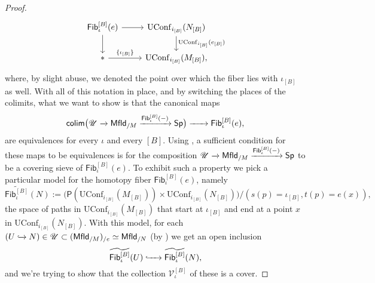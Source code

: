 \documentclass[../text.tex]{subfiles}
\begin{document}
\begin{proof}
\begin{equation}
        \begin{tikzcd}
            \mathsf{Fib}_\iota^{[B]}(e) \arrow[d] \arrow[r] & \mathrm{UConf}_{i_{[B]}}(N_{[B]}) \arrow[d, "\mathrm{UConf}_{i_{[B]}}(e_{[B]})"] \\
            * \arrow[r, "\{\iota_{[B]}\}"] & \mathrm{UConf}_{i_{[B]}}(M_{[B]}),
        \end{tikzcd}
    \end{equation}
    where, by slight abuse, we denoted the point over which the fiber lies with $\iota_{[B]}$ as well. With all of this notation in place, and by switching the places of the colimits, what we want to show is that the canonical maps
    \begin{equation}
        \mathsf{colim} \big( \mathscr{U} \xrightarrow{} \mfld[r]_{/M} \xrightarrow{\mathsf{Fib}_{\iota}^{[B]}(-)} \mathsf{Sp} \big) \xrightarrow{\ \ \ \ \ } \mathsf{Fib}_{\iota}^{[B]}(e),
    \end{equation}
    are equivalences for every $\iota$ and every $[B]$. Using \cite[Prop.A.3.2]{lurie_ha}, a sufficient condition for these maps to be equivalences is for the composition $\mathscr{U} \xrightarrow{} \mfld[r]_{/M} \xrightarrow{\mathsf{Fib}_{\iota}^{[B]}(-)} \mathsf{Sp}$ to be a covering sieve of $\mathsf{Fib}_{\iota}^{[B]}(e)$. To exhibit such a property we pick a particular model for the homotopy fiber $\mathsf{Fib}_{\iota}^{[B]}(e)$, namely
    \begin{equation}
        \widetilde{\mathsf{Fib}_{\iota}^{[B]}}(N) := \big( \mathsf{P}(\mathrm{UConf}_{i_{[B]}}(M_{[B]})) \times \mathrm{UConf}_{i_{[B]}}(N_{[B]}) \big) / (s (p) = \iota_{[B]}, t (p) = e(x)),
    \end{equation}
    the space of paths in $\mathrm{UConf}_{i_{[B]}}(M_{[B]})$ that start at $\iota_{[B]}$ and end at a point $x$ in $\mathrm{UConf}_{i_{[B]}}(N_{[B]})$. With this model, for each $(U \xhookrightarrow{} N) \in \mathscr{U} \subset (\mfld[r]_{/M})_{/e} \simeq \mfld[r]_{/N}$ (by ) we get an open inclusion
    \begin{equation}
        \widetilde{\mathsf{Fib}_{\iota}^{[B]}}(U) \xhookrightarrow{\ \ \ \ } \widetilde{\mathsf{Fib}_{\iota}^{[B]}}(N),
    \end{equation}
    and we're trying to show that the collection $\mathscr{V}_{\iota}^{[B]}$ of these is a cover.


\end{proof}
\end{document}
